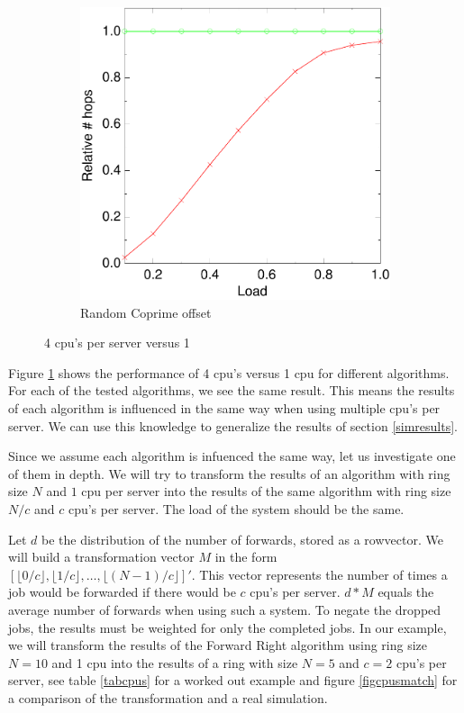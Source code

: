 \documentclass[10pt,a4paper]{article}
\begin{document}
\begin{figure}
        \begin{subfigure}[b]{0.5\textwidth}
                \centering
                \includegraphics[width=\textwidth]{data/4randprimerandprime.pdf}
                \caption{Random Coprime offset}
        \end{subfigure}
        \caption{4 cpu's per server versus 1}\label{figcpus}
\end{figure}

Figure \ref{figcpus} shows the performance of 4 cpu's versus 1 cpu for different algorithms. For each of the tested algorithms, we see the same result. This means the results of each algorithm is influenced in the same way when using multiple cpu's per server. We can use this knowledge to generalize the results of section \ref{simresults}.

Since we assume each algorithm is infuenced the same way, let us investigate one of them in depth. We will try to transform the results of an algorithm with ring size $N$ and $1$ cpu per server into the results of the same algorithm with ring size $N/c$ and $c$ cpu's per server. The load of the system should be the same.

Let $d$ be the distribution of the number of forwards, stored as a rowvector. We will build a transformation vector $M$ in the form $[ \lfloor 0/c \rfloor,  \lfloor 1/c \rfloor, \ldots, \lfloor (N-1)/c \rfloor]'$. This vector represents the number of times a job would be forwarded if there would be $c$ cpu's per server. $d*M$ equals the average number of forwards when using such a system. To negate the dropped jobs, the results must be weighted for only the completed jobs.
In our example, we will transform the results of the Forward Right algorithm using ring size $N=10$ and 1 cpu into the results of a ring with size $N=5$ and $c=2$ cpu's per server, see table \ref{tabcpus} for a worked out example and figure \ref{figcpusmatch} for a comparison of the transformation and a real simulation.
\end{document}

